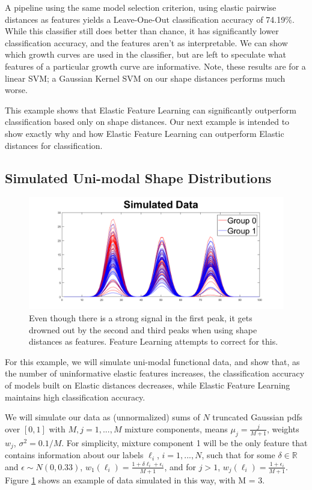 \documentclass[]{article}
\begin{document}
A pipeline using the same model selection criterion, using elastic pairwise distances as features yields a Leave-One-Out classification accuracy of 74.19\%. While this classifier still does better than chance, it has significantly lower classification accuracy, and the features aren't as interpretable. We can show which growth curves are used in the classifier, but are left to speculate what features of a particular growth curve are informative. Note, these results are for a linear SVM; a Gaussian Kernel SVM on our shape distances performs much worse. 

This example shows that Elastic Feature Learning can significantly outperform classification based only on shape distances. Our next example is intended to show exactly why and how Elastic Feature Learning can outperform Elastic distances for classification.  


\subsection{Simulated Uni-modal Shape Distributions}

\begin{figure}
	\includegraphics[width = \linewidth]{./simulated data.png}
	\caption{Even though there is a strong signal in the first peak, it gets drowned out by the second and third peaks when using shape distances as features. Feature Learning attempts to correct for this. }
	\label{simulated data}
\end{figure}

For this example, we will simulate uni-modal functional data, and show that, as the number of uninformative elastic features increases, the classification accuracy of models built on Elastic distances decreases, while Elastic Feature Learning maintains high classification accuracy.  

We will simulate our data as (unnormalized) sums of $N$ truncated Gaussian pdfs over $[0,1]$ with $M, j = 1,...,M$ mixture components, means $\mu_j = \frac{j}{M+1}$, weights $w_j$, $\sigma^2 = 0.1/M$. For simplicity, mixture component 1 will be the only feature that contains information about our labels $\ell_i$, $i = 1,...,N$, such that for some $\delta \in \mathbb{R}$ and $\epsilon \sim N(0,0.33)$, $w_1(\ell_i) = \frac{1 + \delta\ell_i + \epsilon_i}{M + 1}$, and for $j>1$, $w_j(\ell_i) = \frac{1 + \epsilon_i}{M+1}$. Figure \ref{simulated data} shows an example of data simulated in this way, with M = 3.
\end{document}
